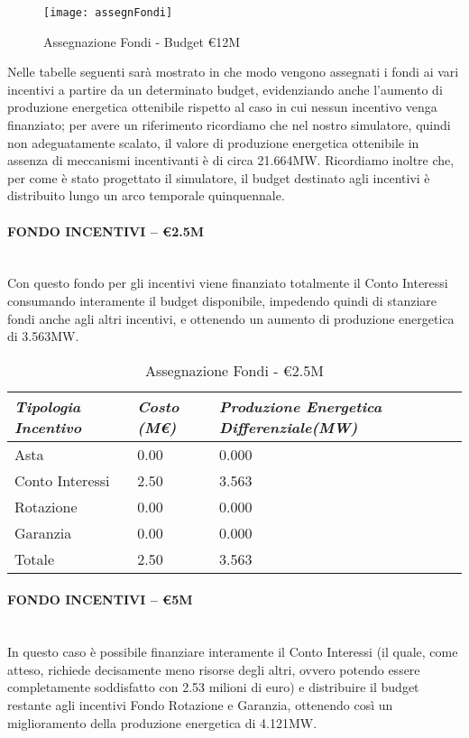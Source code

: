 \documentclass[12pt,a4paper,openright,twoside]{report}
\newcommand{\myparagraph}[1]{\paragraph{#1}\mbox{}\\}
\begin{document}
\begin{figure}[hbt]
	\centering
	\texttt{[image: assegnFondi]}
	\caption{Assegnazione Fondi - Budget \euro12M }
	\label{assegnFondi}
\end{figure}

Nelle tabelle seguenti sarà mostrato in che modo vengono assegnati i fondi ai vari incentivi a partire da un determinato budget, evidenziando anche l'aumento di produzione energetica ottenibile rispetto al caso in cui nessun incentivo venga finanziato; per avere un riferimento ricordiamo che nel nostro simulatore, quindi non adeguatamente scalato, il valore di produzione energetica ottenibile in assenza di meccanismi incentivanti è di circa 21.664MW. Ricordiamo inoltre che, per come è stato progettato il simulatore, il budget destinato agli incentivi è distribuito lungo un arco temporale quinquennale. 

\myparagraph{FONDO INCENTIVI – \euro2.5M}

Con questo fondo per gli incentivi viene finanziato totalmente il Conto Interessi consumando interamente il budget disponibile, impedendo quindi di stanziare fondi anche agli altri incentivi, e ottenendo un aumento di produzione energetica di 3.563MW.

\begin{table}[h]
\centering
	\begin{tabular}{ p{}  | p{} | p{}  }
		\hline \hline 
		\nohyphens{\emph{Tipologia Incentivo}} & \nohyphens{\emph{Costo (M\euro)}} & \nohyphens{\emph{Produzione Energetica Differenziale(MW)}} \\ \hline
		Asta &  0.00 & 0.000 \\ 
		Conto Interessi & 2.50 & 3.563 \\ 
		Rotazione & 0.00 & 0.000 \\ 
		Garanzia & 0.00 & 0.000 \\ \hline 
		Totale & 2.50 & 3.563 \\
		\hline \hline 
	\end{tabular}
	\caption{Assegnazione Fondi - \euro2.5M}
	\label{tab:assegnFondi2M}	
\end{table}

\myparagraph{FONDO INCENTIVI – \euro5M}

In questo caso è possibile finanziare interamente il Conto Interessi (il quale, come atteso, richiede decisamente meno risorse degli altri, ovvero potendo essere completamente soddisfatto con 2.53 milioni di euro) e distribuire il budget restante agli incentivi Fondo Rotazione e Garanzia, ottenendo così un miglioramento della produzione energetica di 4.121MW.
\end{document}
